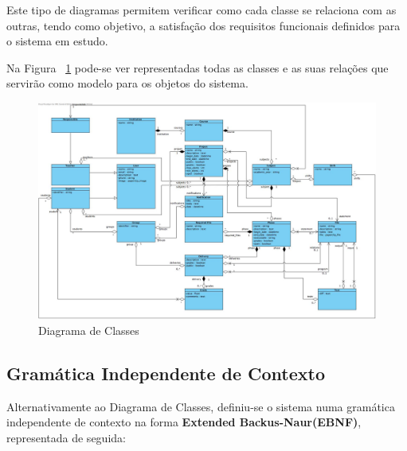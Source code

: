 Este tipo de diagramas permitem verificar como cada classe se relaciona com as outras, tendo como objetivo, a satisfação dos requisitos funcionais definidos para o sistema em estudo. 

Na Figura ~\ref{fig:diagrama-classes} pode-se ver representadas todas as classes e as suas relações que servirão como modelo para os objetos do sistema.

\begin{figure}[H] 
  \centering
  \includegraphics[width=1\textwidth,center]{images/modelo_dados/diagrama-classes}
  \caption{Diagrama de Classes}
  \label{fig:diagrama-classes}
\end{figure}

\subsection{Gramática Independente de Contexto}

Alternativamente ao Diagrama de Classes, definiu-se o sistema numa gramática independente de contexto na forma \textbf{Extended Backus-Naur(EBNF)}, representada de seguida:

